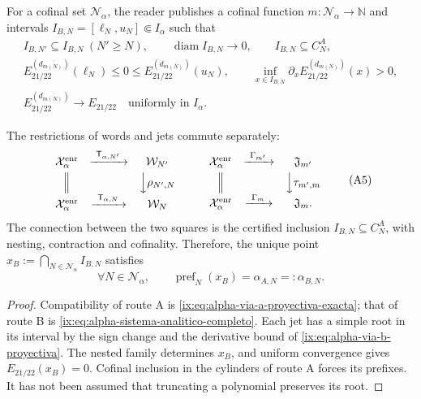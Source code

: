 For a cofinal set \(\mathcal N_\alpha\), the reader publishes a cofinal
function \(m:\mathcal N_\alpha\to\mathbb N\) and intervals
\(I_{B,N}=[\ell_N,u_N]\Subset I_\alpha\) such that
\begin{equation}
\begin{gathered}
 I_{B,N'}\subseteq I_{B,N}\ (N'\ge N),\qquad
 \operatorname{diam}I_{B,N}\longrightarrow0,\qquad
 I_{B,N}\subseteq C_N^A,\\
 E_{21/22}^{(d_{m(N)})}(\ell_N)\le0\le
 E_{21/22}^{(d_{m(N)})}(u_N),\qquad
 \inf_{x\in I_{B,N}}\partial_xE_{21/22}^{(d_{m(N)})}(x)>0,\\
 E_{21/22}^{(d_{m(N)})}\longrightarrow E_{21/22}
 \quad\text{uniformly in }I_\alpha .
\end{gathered}
 \tag{A4}
 \label{ix:eq:alpha-via-b-proyectiva}
\end{equation}

\begin{proposition}
\label{ix:prop:alpha-cuadrados-compatibilidad}
The restrictions of words and jets commute separately:
\[
\begin{array}{ccc}
 \mathcal X_\alpha^{\mathrm{enr}}&
 \xrightarrow{\ \mathsf T_{\alpha,N'}\ }&\mathcal W_{N'}\\[1mm]
 \Big\Vert&&\Big\downarrow\rho_{N',N}\\[1mm]
 \mathcal X_\alpha^{\mathrm{enr}}&
 \xrightarrow{\ \mathsf T_{\alpha,N}\ }&\mathcal W_N
\end{array}
\qquad
\begin{array}{ccc}
 \mathcal X_\alpha^{\mathrm{enr}}&
 \xrightarrow{\ \Gamma_{m'}\ }&\mathfrak J_{m'}\\[1mm]
 \Big\Vert&&\Big\downarrow\tau_{m',m}\\[1mm]
 \mathcal X_\alpha^{\mathrm{enr}}&
 \xrightarrow{\ \Gamma_m\ }&\mathfrak J_m .
\end{array}
 \tag{A5}
\]
The connection between the two squares is the certified inclusion
\(I_{B,N}\subseteq C_N^A\), with nesting, contraction and cofinality.
Therefore, the unique point
\(x_B:=\bigcap_{N\in\mathcal N_\alpha}I_{B,N}\) satisfies
\begin{equation}
 \forall N\in\mathcal N_\alpha,\qquad
 \operatorname{pref}_N(x_B)=\alpha_{A,N}=:\alpha_{B,N}.
 \tag{A6}
 \label{ix:eq:alpha-igualdad-cada-nivel}
\end{equation}
\end{proposition}

\begin{proof}
Compatibility of route A is
\eqref{ix:eq:alpha-via-a-proyectiva-exacta}; that of route B is
\eqref{ix:eq:alpha-sistema-analitico-completo}. Each jet has a simple root
in its interval by the sign change and the derivative bound of
\eqref{ix:eq:alpha-via-b-proyectiva}. The nested family determines \(x_B\), and
uniform convergence gives \(E_{21/22}(x_B)=0\). Cofinal inclusion in the
cylinders of route A forces its prefixes. It has not been assumed that truncating a
polynomial preserves its root.
\end{proof}

